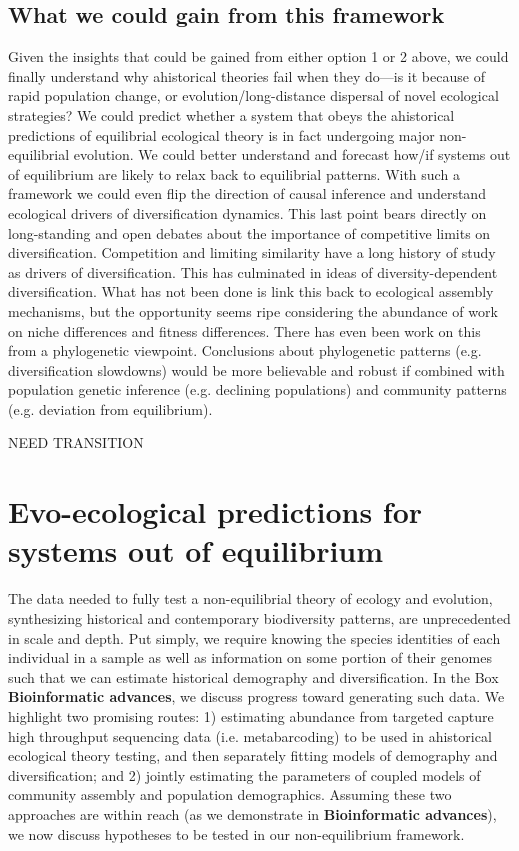 \documentclass[12pt]{article}
\newcounter{Box}
\begin{document}
\subsection{What we could gain from this framework}

Given the insights that could be gained from either option 1 or 2
above, we could finally understand why ahistorical theories fail when
they do---is it because of rapid population change, or
evolution/long-distance dispersal of novel ecological strategies? We
could predict whether a system that obeys the ahistorical predictions
of equilibrial ecological theory is in fact undergoing major
non-equilibrial evolution. We could better understand and forecast
how/if systems out of equilibrium are likely to relax back to
equilibrial patterns. With such a framework we could even flip the
direction of causal inference and understand ecological drivers of
diversification dynamics. This last point bears directly on
long-standing and open debates about the importance of competitive
limits on diversification. Competition and limiting similarity have a
long history of study as drivers of diversification. This has
culminated in ideas of diversity-dependent
diversification\cite{Etienne2012-ky, Rabosky2013-gk, Rabosky2008-bs}.
What has not been done is link this back to ecological assembly
mechanisms, but the opportunity seems ripe considering the abundance
of work on niche differences and fitness
differences\cite{Chesson2000-uc, Adler2007-pl, HilleRisLambers2012-xt,
  Levine2009-qj}.  There has even been work on this from a
phylogenetic viewpoint\cite{Mayfield2010-hg, Godoy2014-iv}.
Conclusions about phylogenetic patterns (e.g. diversification
slowdowns) would be more believable and robust if combined with
population genetic inference (e.g. declining populations) and
community patterns (e.g.  deviation from equilibrium).

NEED TRANSITION

\section{Evo-ecological predictions for systems out of equilibrium}

The data needed to fully test a non-equilibrial theory of ecology and
evolution, synthesizing historical and contemporary biodiversity
patterns, are unprecedented in scale and depth. Put simply, we require
knowing the species identities of each individual in a sample as well
as information on some portion of their genomes such that we can
estimate historical demography and diversification. In the Box
\textbf{Bioinformatic advances}, we discuss progress toward generating
such data. We highlight two promising routes: 1) estimating abundance
from targeted capture high throughput sequencing data (i.e.
metabarcoding) to be used in ahistorical ecological theory testing,
and then separately fitting models of demography and diversification;
and 2) jointly estimating the parameters of coupled models of
community assembly and population demographics. Assuming these two
approaches are within reach (as we demonstrate in
\textbf{Bioinformatic advances}), we now discuss hypotheses to be
tested in our non-equilibrium framework.
\end{document}
